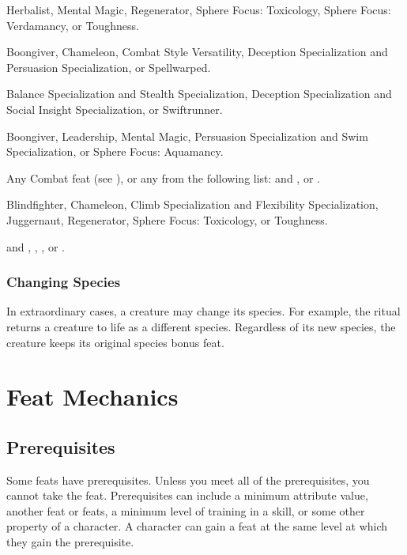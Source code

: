        Herbalist, Mental Magic, Regenerator, Sphere Focus: Toxicology, Sphere Focus: Verdamancy, or Toughness.

       Boongiver, Chameleon, Combat Style Versatility, Deception Specialization and Persuasion Specialization, or Spellwarped.

       Balance Specialization and Stealth Specialization, Deception Specialization and Social Insight Specialization, or Swiftrunner.

       Boongiver, Leadership, Mental Magic, Persuasion Specialization and Swim Specialization, or Sphere Focus: Aquamancy.

       Any Combat feat (see ), or any from the following list:  and , or .

       Blindfighter, Chameleon, Climb Specialization and Flexibility Specialization, Juggernaut, Regenerator, Sphere Focus: Toxicology, or Toughness.

        and , , , or .

    \subsubsection{Changing Species}
      In extraordinary cases, a creature may change its species.
      For example, the  ritual returns a creature to life as a different species.
      Regardless of its new species, the creature keeps its original species bonus feat.

\section{Feat Mechanics}

  \subsection{Prerequisites}
    Some feats have prerequisites.
    Unless you meet all of the prerequisites, you cannot take the feat.
    Prerequisites can include a minimum attribute value, another feat or feats, a minimum level of training in a skill, or some other property of a character.
    A character can gain a feat at the same level at which they gain the prerequisite.

